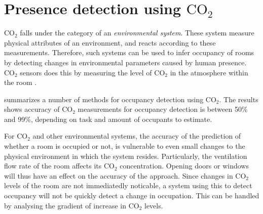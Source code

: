 \section{Presence detection using $\text{CO}_{2}$ }\label{sec:presence_env}
$\text{CO}_{2}$ falls under the category of an \textit{environmental system}. 
These system measure physical attributes of an environment, and reacts according to these measurements.
Therefore, such systems can be used to infer occupancy of rooms by detecting changes in environmental parameters caused by human presence.
$\text{CO}_{2}$ sensors does this by measuring the level of $\text{CO}_{2}$ in the atmosphere within the room \cite{longoAccurateOccupancyEstimation2019, gruberCO2SensorsOccupancy2014}.

\citeauthor{longoAccurateOccupancyEstimation2019}\cite{longoAccurateOccupancyEstimation2019} summarizes a number of methods for occupancy detection using $\text{CO}_{2}$. 
The results shows accuracy of $\text{CO}_{2}$ measurements for occupancy detection is between 50\% and 99\%, depending on task and amount of occupants to estimate.

For $\text{CO}_{2}$ and other environmental systems, the accuracy of the prediction of whether a room is occupied or not, is vulnerable to even small changes to the physical environment in which the system resides.\cite{gruberCO2SensorsOccupancy2014,longoAccurateOccupancyEstimation2019}
Particularly, the ventilation flow rate of the room affects its $\text{CO}_{2}$ concentration. Opening doors or windows will thus have an effect on the accuracy of the approach.
Since changes in $\text{CO}_{2}$ levels of the room are not immediatedly noticable, a system using this to detect occupancy will not be quickly detect a change in occupation.
This can be handled by analysing the gradient of increase in $\text{CO}_{2}$ levels\cite{gradient_co2}.
